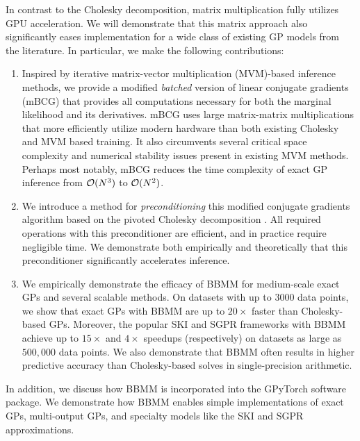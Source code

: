 In contrast to the Cholesky decomposition, matrix multiplication fully utilizes GPU acceleration.
We will demonstrate that this matrix approach also significantly eases implementation for a wide class of existing GP models from the literature.
In particular, we make the following contributions:

\begin{enumerate}
	\item Inspired by iterative matrix-vector multiplication (MVM)-based inference methods, we provide a modified \emph{batched} version of linear conjugate gradients (mBCG) that provides all computations necessary for both the marginal likelihood and its derivatives.
		mBCG uses large matrix-matrix multiplications that more efficiently utilize modern hardware than both existing Cholesky and MVM based training.
		It also circumvents several critical space complexity and numerical stability issues present in existing MVM methods.
		Perhaps most notably, mBCG reduces the time complexity of exact GP inference from $\bigo{N^3}$ to $\bigo{N^2}$.

	\item We introduce a method for \emph{preconditioning} this modified conjugate gradients algorithm based on the pivoted Cholesky decomposition \cite{bach2013sharp,harbrecht2012low}.
		All required operations with this preconditioner are efficient, and in practice require negligible time.
		We demonstrate both empirically and theoretically that this preconditioner significantly accelerates inference.

	\item We empirically demonstrate the efficacy of BBMM for medium-scale exact GPs and several scalable methods.
		On datasets with up to $3000$ data points, we show that exact GPs with BBMM are up to $20\times$ faster than Cholesky-based GPs.
		Moreover, the popular SKI \cite{wilson2015kernel} and SGPR \cite{titsias2009variational} frameworks with BBMM achieve up to $15\times$ and $4\times$ speedups (respectively) on datasets as large as $500,\!000$ data points.
		We also demonstrate that BBMM often results in higher predictive accuracy than Cholesky-based solves in single-precision arithmetic.
\end{enumerate}
%
\noindent
In addition, we discuss how BBMM is incorporated into the GPyTorch software package.
We demonstrate how BBMM enables simple implementations of exact GPs, multi-output GPs, and specialty models like the SKI and SGPR approximations.

